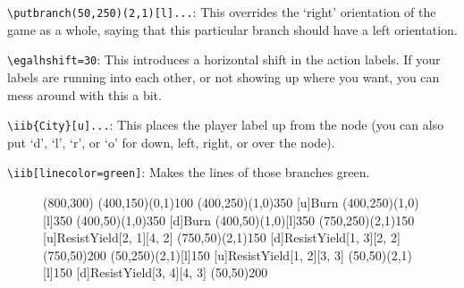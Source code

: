 \documentclass{article}
\begin{document}
\begin{compactitem}
\item \verb+\putbranch(50,250)(2,1)[l]...+: This overrides the `right' orientation of the game as a whole, saying that this particular branch should have a left orientation.
\item \verb+\egalhshift=30+: This introduces a horizontal shift in the action labels.  If your labels are running into each other, or not showing up where you want, you can mess around with this a bit.
\item \verb+\iib{City}[u]...+: This places the player label up from the node (you can also put `d', `l', `r', or `o' for down, left, right, or over the node).
\item \verb+\iib[linecolor=green]+: Makes the lines of those branches green.\\
\end{compactitem}

\vspace{.5cm}

\begin{figure}[h]
\begin{footnotesize}
\begin{center}
\begin{egame}(800,300)
\putbranch(400,150)(0,1){100} 
\putbranch(400,250)(1,0){350} [u]{Burn}
\putbranch(400,250)(1,0)[l]{350} 
\putbranch(400,50)(1,0){350} [d]{Burn}
\putbranch(400,50)(1,0)[l]{350} 
\putbranch(750,250)(2,1){150}  [u]{Resist}{Yield}[2, 1][4, 2]
\putbranch(750,50)(2,1){150}  [d]{Resist}{Yield}[1, 3][2, 2]
\infoset(750,50){200}{}
\putbranch(50,250)(2,1)[l]{150}   [u]{Resist}{Yield}[1, 2][3, 3]
\putbranch(50,50)(2,1)[l]{150}   [d]{Resist}{Yield}[3, 4][4, 3]
\infoset(50,50){200}{}
\end{egame}
\end{center}
\end{footnotesize}
\end{figure}

\vspace{.5cm}
\end{document}

